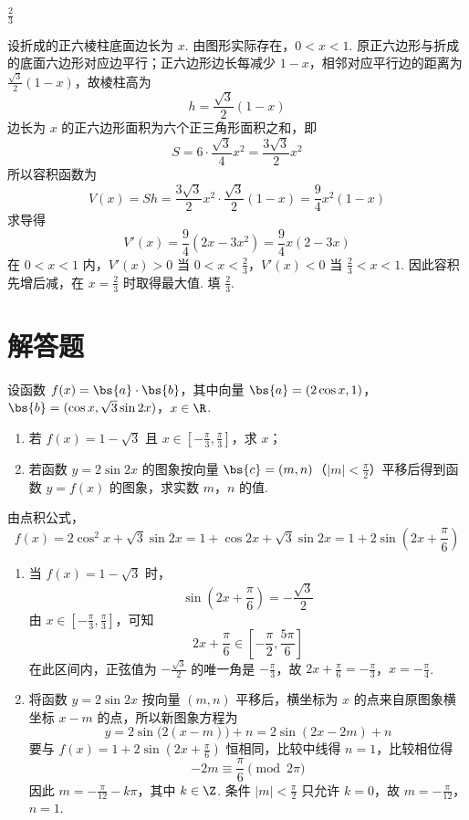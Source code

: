 \begin{answer}
\(\frac{2}{3}\)
\end{answer}

\begin{solution}
设折成的正六棱柱底面边长为 \(x\). 由图形实际存在，\(0<x<1\). 原正六边形与折成的底面六边形对应边平行；正六边形边长每减少 \(1-x\)，相邻对应平行边的距离为 \(\frac{\sqrt3}{2}(1-x)\)，故棱柱高为
\[
h=\frac{\sqrt3}{2}(1-x)
\]
边长为 \(x\) 的正六边形面积为六个正三角形面积之和，即
\[
S=6\cdot\frac{\sqrt3}{4}x^2=\frac{3\sqrt3}{2}x^2
\]
所以容积函数为
\[
V(x)=Sh=\frac{3\sqrt3}{2}x^2\cdot\frac{\sqrt3}{2}(1-x)
=\frac94x^2(1-x)
\]
求导得
\[
V'(x)=\frac94(2x-3x^2)=\frac94x(2-3x)
\]
在 \(0<x<1\) 内，\(V'(x)>0\) 当 \(0<x<\frac23\)，\(V'(x)<0\) 当 \(\frac23<x<1\). 因此容积先增后减，在 \(x=\frac23\) 时取得最大值. 填 \(\frac23\).
\end{solution}

\section{解答题}
\begin{problem}
设函数 \(f(x) = \bs{a} \cdot \bs{b}\)，其中向量 \(\bs{a} = (2\cos x, 1)\)，\(\bs{b} = (\cos x, \sqrt{3}\sin 2x)\)，\(x \in \R\).

\begin{enumerate}
\item 若 \(f(x) = 1 - \sqrt{3}\) 且 \(x \in \left[-\frac{\pi}{3}, \frac{\pi}{3}\right]\)，求 \(x\)；
\item 若函数 \(y = 2\sin 2x\) 的图象按向量 \(\bs{c} = (m, n)\)（\(|m| < \frac{\pi}{2}\)）平移后得到函数 \(y = f(x)\) 的图象，求实数 \(m\)，\(n\) 的值.
\end{enumerate}
\end{problem}

\begin{solution}
由点积公式，
\[
f(x)=2\cos^2x+\sqrt3\sin2x
=1+\cos2x+\sqrt3\sin2x
=1+2\sin\left(2x+\frac{\pi}{6}\right)
\]

\begin{enumerate}
\item 当 \(f(x)=1-\sqrt3\) 时，
\[
\sin\left(2x+\frac{\pi}{6}\right)=-\frac{\sqrt3}{2}
\]
由 \(x\in\left[-\frac{\pi}{3},\frac{\pi}{3}\right]\)，可知
\[
2x+\frac{\pi}{6}\in\left[-\frac{\pi}{2},\frac{5\pi}{6}\right]
\]
在此区间内，正弦值为 \(-\frac{\sqrt3}{2}\) 的唯一角是 \(-\frac{\pi}{3}\)，故
\(2x+\frac{\pi}{6}=-\frac{\pi}{3}\)，\(x=-\frac{\pi}{4}\).
\item 将函数 \(y=2\sin2x\) 按向量 \((m,n)\) 平移后，横坐标为 \(x\) 的点来自原图象横坐标 \(x-m\) 的点，所以新图象方程为
\[
y=2\sin\bigl(2(x-m)\bigr)+n
=2\sin(2x-2m)+n
\]
要与 \(f(x)=1+2\sin(2x+\frac{\pi}{6})\) 恒相同，比较中线得 \(n=1\)，比较相位得
\[
-2m\equiv\frac{\pi}{6}\pmod{2\pi}
\]
因此 \(m=-\frac{\pi}{12}-k\pi\)，其中 \(k\in\Z\). 条件 \(|m|<\frac{\pi}{2}\) 只允许 \(k=0\)，故 \(m=-\frac{\pi}{12}\)，\(n=1\).
\end{enumerate}
\end{solution}

